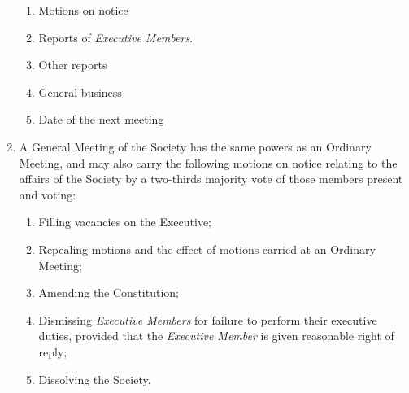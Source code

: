 \documentclass[11pt]{article}
\begin{document}
\begin{enumerate}[\thesection .1]
\begin{enumerate}[\hspace{5mm}1.]
    	\item Motions on notice
    	\item Reports of \textit{Executive Members}.
    	\item Other reports
    	\item General business
    	\item Date of the next meeting
    \end{enumerate}
    \item A General Meeting of the Society has the same powers as an Ordinary Meeting, and may also carry the following motions on notice relating to the affairs of the Society by a two-thirds majority vote of those members present and voting:
    \begin{enumerate}
        \item Filling vacancies on the Executive;
        \item Repealing motions and the effect of motions carried at an Ordinary Meeting;
        \item Amending the Constitution;
        \item Dismissing \textit{Executive Members} for failure to perform their executive duties, provided that the \textit{Executive Member} is given reasonable right of reply;
        \item Dissolving the Society.
    \end{enumerate}
\end{enumerate}
\end{document}
